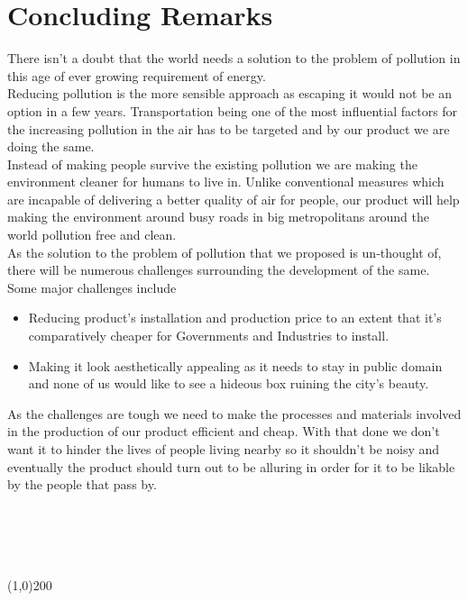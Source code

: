 \documentclass[12pt]{article}
\begin{document}
\newpage

\section{Concluding Remarks}

There isn't a doubt that the world needs a solution to the problem of pollution in this age of ever growing requirement of energy. \\

Reducing pollution is the more sensible approach as escaping it would not be an option in a few years. Transportation being one of the most influential factors for the increasing pollution in the air has to be targeted and by our product we are doing the same. \\

Instead of making people survive the existing pollution we are making the environment cleaner for humans to live in. Unlike conventional measures which are incapable of delivering a better quality of air for people, our product will help making the environment around busy roads in big metropolitans around the world pollution free and clean. \\

As the solution to the problem of pollution that we proposed is un-thought of,  there will be numerous challenges surrounding the development of the same. Some major challenges include

\begin{itemize}
\item Reducing product's installation and production price to an extent that it's comparatively cheaper for Governments and Industries to install.

\item Making it look aesthetically appealing as it needs to stay in public domain and none of us would like to see a hideous box ruining the city's beauty.

\end{itemize}

As the challenges are tough we need to make the processes and materials involved in the production of our product efficient and cheap. With that done we don't want it to hinder the lives of people living nearby so it shouldn't be noisy and eventually the product should turn out to be alluring in order for it to be likable by the people that pass by. \\ \\ \\ \\ \\

\begin{center}
\line(1,0){200}
\end{center}
\end{document}
